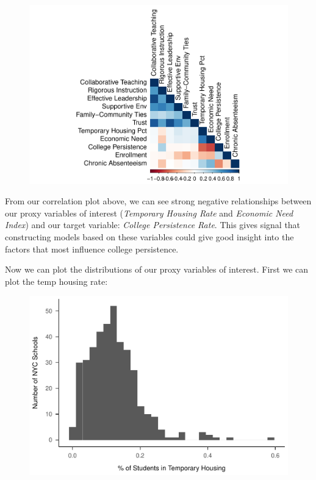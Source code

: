 \documentclass[
  man,floatsintext]{apa6}
\begin{document}
\begin{figure}[H]
\includegraphics[width=\textwidth]{final-project_files/figure-latex/unnamed-chunk-5-1} \caption{ }\label{fig:unnamed-chunk-5}
\end{figure}

From our correlation plot above, we can see strong negative relationships between our proxy variables of interest (\emph{Temporary Housing Rate} and \emph{Economic Need Index}) and our target variable: \emph{College Persistence Rate}. This gives signal that constructing models based on these variables could give good insight into the factors that most influence college persistence.

Now we can plot the distributions of our proxy variables of interest. First we can plot the temp housing rate:

\begin{figure}[H]
\includegraphics[width=\textwidth]{final-project_files/figure-latex/temp-housing-rates-1} \caption{ }\label{fig:temp-housing-rates}
\end{figure}
\end{document}
